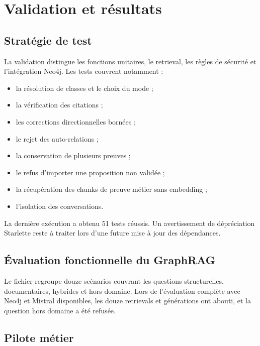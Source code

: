 \chapter{Validation et résultats}

\section{Stratégie de test}

La validation distingue les fonctions unitaires, le retrieval, les règles de sécurité et l'intégration Neo4j. Les tests couvrent notamment :

\begin{itemize}
  \item la résolution de classes et le choix du mode ;
  \item la vérification des citations ;
  \item les corrections directionnelles bornées ;
  \item le rejet des auto-relations ;
  \item la conservation de plusieurs preuves ;
  \item le refus d'importer une proposition non validée ;
  \item la récupération des chunks de preuve métier sans embedding ;
  \item l'isolation des conversations.
\end{itemize}

La dernière exécution a obtenu 51 tests réussis. Un avertissement de dépréciation Starlette reste à traiter lors d'une future mise à jour des dépendances.


\section{Évaluation fonctionnelle du GraphRAG}

Le fichier  regroupe douze scénarios couvrant les questions structurelles, documentaires, hybrides et hors domaine. Lors de l'évaluation complète avec Neo4j et Mistral disponibles, les douze retrievals et générations ont abouti, et la question hors domaine a été refusée.

\section{Pilote métier}

